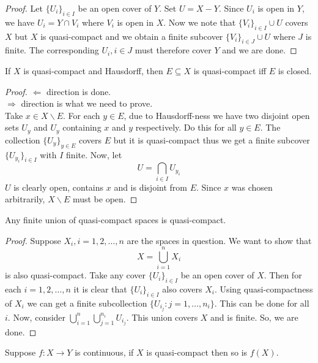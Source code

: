 \documentclass[oneside, 12pt, ]{scrbook}
\theoremstyle{theorem}
\begin{document}
\begin{proof}
Let $\{U_{i}\}_{i \in I}$ be an open cover of $Y$. Set $U = X - Y$. Since $U_{i}$ is open in $Y$, we have $U_{i} = Y \cap V_{i}$ where $V_{i}$ is open in $X$. Now we note that $\{V_{i}\}_{i \in I} \cup U$ covers $X$ but $X$ is quasi-compact and we obtain a finite subcover $\{V_{i}\}_{i \in J} \cup U$ where $J$ is finite. The corresponding $U_{i}, i \in J$ must therefore cover $Y$ and we are done.
\end{proof}

\begin{proposition}
If $X$ is quasi-compact and Hausdorff, then $E \subseteq X$ is quasi-compact iff $E$ is closed.
\end{proposition}

\begin{proof}
$\Leftarrow$ direction is done. \\
$\Rightarrow$ direction is what we need to prove. \\
Take $x\in X \backslash E$. For each $y \in E$, due to Hausdorff-ness we have two disjoint open sets $U_{y}$ and $U_{y}$ containing $x$ and $y$ respectively. Do this for all $y \in E$. The collection $\{U_{y}\}_{y \in E}$ covers $E$ but it is quasi-compact thus we get a finite subcover $\{U_{y_{i}}\}_{i \in I}$ with $I$ finite. Now, let $$U = \bigcap_{i \in I} U_{y_{i}}$$ $U$ is clearly open, contains $x$ and is disjoint from $E$. Since $x$ was chosen arbitrarily, $X\backslash E$ must be open. 
\end{proof}

\begin{lemma}
Any finite union of quasi-compact spaces is quasi-compact.
\end{lemma}

\begin{proof}
Suppose $X_{i}, i =1,2,\hdots ,n$ are the spaces in question. We want to show that $$X = \bigcup_{i=1}^n X_{i}$$ is also quasi-compact. Take any cover $\{U_{i}\}_{i \in I}$  be an open cover of $X$. Then for each $i=1,2, \hdots , n$ it is clear that $\{U_{i}\}_{i \in I}$ also covers $X_{i}$. Using quasi-compactness of $X_{i}$ we can get a finite subcollection $\{U_{i_{j}}: j =1 , \hdots , n_{i}\}$. This can be done for all $i$. Now, consider $\bigcup_{i=1}^{n} \bigcup_{j=1}^{n_{i}} U_{i_{j}}$. This union covers $X$ and is finite. So, we are done. 
\end{proof}

\begin{lemma}
Suppose $f: X \rightarrow Y$ is continuous, if $X$ is quasi-compact then so is $f(X)$.
\end{lemma}
\end{document}
